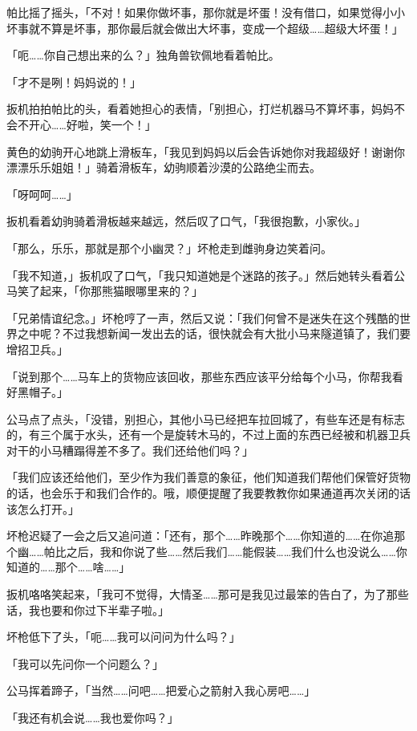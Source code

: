 帕比摇了摇头，「不对！如果你做坏事，那你就是坏蛋！没有借口，如果觉得小小坏事就不算是坏事，那你最后就会做出大坏事，变成一个超级……超级大坏蛋！」

「呃……你自己想出来的么？」独角兽钦佩地看着帕比。

「才不是咧！妈妈说的！」

扳机拍拍帕比的头，看着她担心的表情，「别担心，打烂机器马不算坏事，妈妈不会不开心……好啦，笑一个！」

黄色的幼驹开心地跳上滑板车，「我见到妈妈以后会告诉她你对我超级好！谢谢你漂漂乐乐姐姐！」骑着滑板车，幼驹顺着沙漠的公路绝尘而去。

「呀呵呵……」

扳机看着幼驹骑着滑板越来越远，然后叹了口气，「我很抱歉，小家伙。」

「那么，乐乐，那就是那个小幽灵？」坏枪走到雌驹身边笑着问。

「我不知道，」扳机叹了口气，「我只知道她是个迷路的孩子。」然后她转头看着公马笑了起来，「你那熊猫眼哪里来的？」

「兄弟情谊纪念。」坏枪哼了一声，然后又说：「我们何曾不是迷失在这个残酷的世界之中呢？不过我想新闻一发出去的话，很快就会有大批小马来隧道镇了，我们要增招卫兵。」

「说到那个……马车上的货物应该回收，那些东西应该平分给每个小马，你帮我看好黑帽子。」

公马点了点头，「没错，别担心，其他小马已经把车拉回城了，有些车还是有标志的，有三个属于水头，还有一个是旋转木马的，不过上面的东西已经被和机器卫兵对干的小马糟蹋得差不多了。我们还给他们吗？」

「我们应该还给他们，至少作为我们善意的象征，他们知道我们帮他们保管好货物的话，也会乐于和我们合作的。哦，顺便提醒了我要教教你如果通道再次关闭的话该怎么打开。」

坏枪迟疑了一会之后又追问道：「还有，那个……昨晚那个……你知道的……在你追那个幽……帕比之后，我和你说了些……然后我们……能假装……我们什么也没说么……你知道的……那个……啥……」

扳机咯咯笑起来，「我可不觉得，大情圣……那可是我见过最笨的告白了，为了那些话，我也要和你过下半辈子啦。」

坏枪低下了头，「呃……我可以问问为什么吗？」

「我可以先问你一个问题么？」

公马挥着蹄子，「当然……问吧……把爱心之箭射入我心房吧……」

「我还有机会说……我也爱你吗？」

\horizonline


